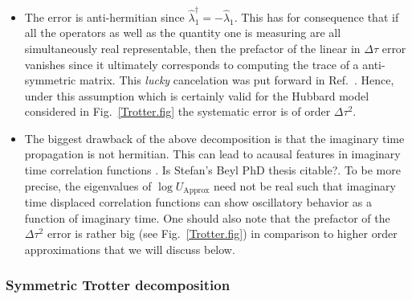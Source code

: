 \begin{itemize}
\item    The error is anti-hermitian  since $\hat{\lambda}_1^{\dagger} = - \hat{\lambda}_1 $.  This has for consequence that if all the operators as well as  the quantity one is measuring are all  simultaneously real representable,  then   the prefactor of the linear in $\Delta  \tau$ error vanishes since it ultimately corresponds to computing the trace of a  anti-symmetric matrix. This \textit{lucky}   cancelation was put forward in  Ref.~\cite{Fye86}.   Hence, under this assumption which is certainly valid for the Hubbard model considered in Fig.~\ref{Trotter.fig}   the systematic error is of order $\Delta \tau^2$. 
\item   The biggest drawback  of the above decomposition is that  the imaginary time propagation is not hermitian.   This can lead to acausal  features in imaginary time   correlation functions \cite{Beyl_thesis}. { \color{red} Is Stefan's Beyl PhD thesis citable?}.   To be more precise, the eigenvalues of  
$ \log  U_{\text{Approx}}$   need not be real such that imaginary time displaced correlation functions can show oscillatory behavior as a function of imaginary time. One  should also note that  the  prefactor of the $\Delta \tau^2$ error is rather big (see Fig.~\ref{Trotter.fig})  in comparison to higher order approximations that we  will discuss below. 
\end{itemize}


\subsubsection{ Symmetric Trotter decomposition } 

